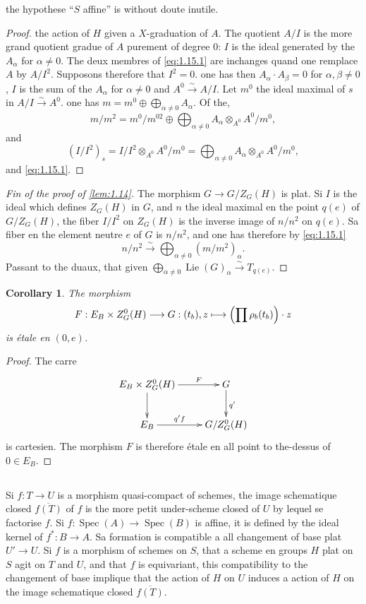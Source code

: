 \documentclass[11pt,a4paper]{article}
\theoremstyle{plain}
\newtheorem{corollary}[theorem]{Corollary}
\theoremstyle{definition}
\DeclareMathOperator{\Spec}{Spec}
\DeclareMathOperator{\Lie}{Lie}
\begin{document}
the hypothese ``$S$ affine'' is without doute inutile.

\begin{proof}
the action of $H$ given a $X$-graduation of $A$. The quotient $A/I$ is the more grand quotient gradue of $A$ purement of degree $0$: $I$ is the ideal generated by the $A_\alpha$ for $\alpha \neq 0$. The deux membres of \eqref{eq:1.15.1} are inchanges quand one remplace $A$ by $A/I^2$. Supposons therefore that $I^2 = 0$. one has then $A_\alpha \cdot A_\beta = 0$ for $\alpha, \beta \neq 0$, $I$ is the sum of the $A_\alpha$ for $\alpha \neq 0$ and $A^0 \xrightarrow{\sim} A/I$. Let $m^0$ the ideal maximal of $s$ in $A/I \xrightarrow{\sim} A^0$. one has $m = m^0 \oplus \bigoplus_{\alpha \neq 0} A_\alpha$. Of the,
\[
m/m^2 = m^0/m^{02} \oplus \bigoplus_{\alpha \neq 0} A_\alpha \otimes_{A^0} A^0/m^0,
\]
and
\[
(I/I^2)_s = I/I^2 \otimes_{A^0} A^0/m^0 = \bigoplus_{\alpha \neq 0} A_\alpha \otimes_{A^0} A^0/m^0,
\]
and \eqref{eq:1.15.1}.
\end{proof}

\begin{proof}[Fin of the proof of \ref{lem:1.14}]
The morphism $G \to G/Z_G(H)$ is plat. Si $I$ is the ideal which defines $Z_G(H)$ in $G$, and $n$ the ideal maximal en the point $q(e)$ of $G/Z_G(H)$, the fiber $I/I^2$ on $Z_G(H)$ is the inverse image of $n/n^2$ on $q(e)$. Sa fiber en the element neutre $e$ of $G$ is $n/n^2$, and one has therefore by \eqref{eq:1.15.1}
\[
n/n^2 \xrightarrow{\sim} \bigoplus_{\alpha \neq 0} (m/m^2)_\alpha.
\]
Passant to the duaux, that given $\bigoplus_{\alpha \neq 0} \Lie(G)_\alpha \xrightarrow{\sim} T_{q(e)}$.
\end{proof}

\begin{corollary}\label{cor:1.16}
The morphism
\[
F: E_B \times Z^0_G(H) \longrightarrow G: (t_b), z \longmapsto \Bigl(\prod \rho_b(t_b)\Bigr) \cdot z
\]
is étale en $(0,e)$.
\end{corollary}

\begin{proof}
The carre
\[
\xymatrix{
E_B \times Z^0_G(H) \ar[r]^-{F} \ar[d] & G \ar[d]^{q'} \\
E_B \ar[r]^-{q'f} & G/Z^0_G(H)
}
\]
is cartesien. The morphism $F$ is therefore étale en all point to the-dessus of $0 \in E_B$.
\end{proof}

\subsection{}
Si $f: T \to U$ is a morphism quasi-compact of schemes, the image schematique closed $\overline{f(T)}$ of $f$ is the more petit under-scheme closed of $U$ by lequel se factorise $f$. Si $f: \Spec(A) \to \Spec(B)$ is affine, it is defined by the ideal kernel of $f^*: B \to A$. Sa formation is compatible a all changement of base plat $U' \to U$. Si $f$ is a morphism of schemes on $S$, that a scheme en groups $H$ plat on $S$ agit on $T$ and $U$, and that $f$ is equivariant, this compatibility to the changement of base implique that the action of $H$ on $U$ induces a action of $H$ on the image schematique closed $\overline{f(T)}$.
\end{document}
